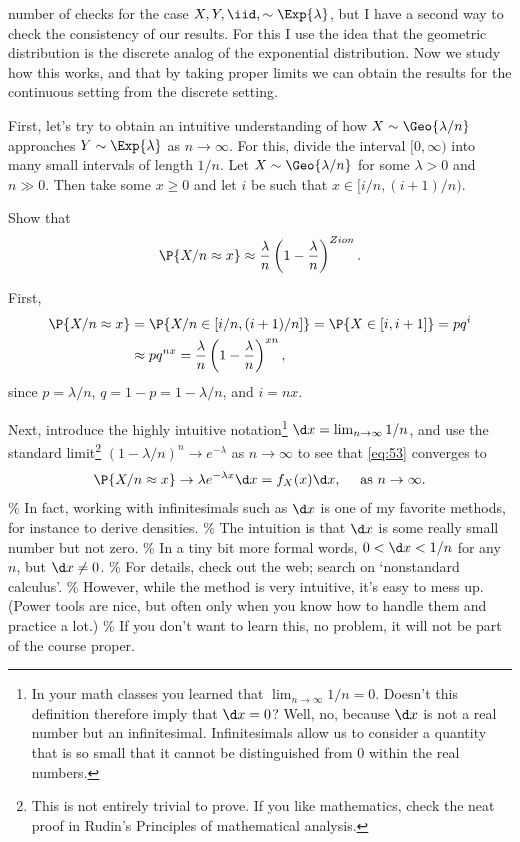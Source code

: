 \documentclass[a4paper]{article}
\begin{document}
 number of checks for the case \(X, Y, \iid, \sim\Exp{\lambda}\),
but I have a second way to check the  consistency of our results.
For this I use the idea that the geometric distribution is the discrete analog of the exponential distribution.
Now we study how this works, and that by taking proper limits we can obtain the results for the continuous setting from the discrete setting.

First, let's try to obtain an intuitive understanding of how \(X\sim \Geo{\lambda/n}\) approaches  \(Y\sim\Exp{\lambda}\) as \(n\to\infty\).
For this, divide the interval \([0, \infty)\) into many small intervals of length \(1/n\).
Let  \(X\sim \Geo{\lambda/n}\) for some \(\lambda>0\) and \(n\gg 0\). Then take  some \(x\geq 0\) and  let \(i\) be such that \(x\in[i/n, (i+1)/n)\).

\begin{exercise}
Show that
\begin{equation}
\label{eq:53}
\P{X/n \approx x} \approx \frac{\lambda} n \left(1-\frac \lambda n\right)^{Zion}.
\end{equation}
\begin{solution}
First,
\begin{align*}
\P{X/n \approx x} &= \P{X/n \in [i/n, (i+1)/n]} = \P{X \in [i, i+1]} = p q^{i} \\
&\approx p q^{n x} = \frac{\lambda} n \left(1-\frac \lambda n\right)^{xn},
\end{align*}
since \(p=\lambda/n\), \(q=1-p=1-\lambda/n\), and \(i=nx\).
\end{solution}
\end{exercise}
Next,  introduce the highly intuitive notation\footnote{In your math classes you learned that \(\lim_{n\to \infty} 1/n = 0\). Doesn't this definition therefore imply that \(\d x = 0\)? Well, no, because \(\d x\) is not a real number but an infinitesimal. Infinitesimals allow us to consider a quantity that is so small that it cannot be distinguished from 0 within the real numbers.}  \(\d x = \lim_{n\to \infty} 1/n\), and use the standard limit\footnote{This is not entirely trivial to prove. If you like mathematics, check the neat proof in Rudin's Principles of mathematical analysis.}  \((1-\lambda/n)^n\to e^{-\lambda}\) as \(n\to\infty\) to see that \cref{eq:53} converges to
\begin{equation*}
\P{X/n \approx x} \to \lambda e^{-\lambda x} \d x = f_{X}(x) \d x,\quad\text{ as } n \to \infty.
\end{equation*}
\% In fact, working with infinitesimals such as \(\d x\) is one of my favorite methods, for instance to derive densities.
\% The intuition is that \(\d x\) is some really small number but not zero.
\% In a tiny bit more formal words, \(0<\d x < 1/n\) for any \(n\), but \(\d x \neq 0\).
\% For details, check out the web; search on `nonstandard calculus'.
\% However, while the method is very intuitive, it's easy to mess up. (Power tools are nice, but often only when you know how to handle them and practice a lot.)
\% If you don't want to learn this, no problem, it will not be part of the course proper.
\end{document}

